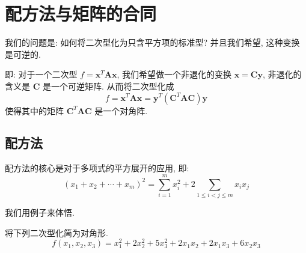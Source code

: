 \documentclass[UTF8]{book}
\begin{document}
\section{配方法与矩阵的合同}

我们的问题是: 
如何将二次型化为只含平方项的标准型? 
并且我们希望, 这种变换是可逆的. 

即: 对于一个二次型 $f = \boldsymbol{x}^T \boldsymbol{A} \boldsymbol{x}$, 
我们希望做一个非退化的变换 
$ \boldsymbol{x} = \boldsymbol{C}\boldsymbol{y} $, 
非退化的含义是 $ \boldsymbol{C} $ 是一个可逆矩阵. 
从而将二次型化成 
$$ f =\boldsymbol{x}^T \boldsymbol{A} \boldsymbol{x} =
\boldsymbol{y}^T (\boldsymbol{C}^T\boldsymbol{A} \boldsymbol{C})
\boldsymbol{y}  $$
使得其中的矩阵 $ \boldsymbol{C}^T\boldsymbol{A} \boldsymbol{C} $ 
是一个对角阵. 

\subsection{配方法}
配方法的核心是对于多项式的平方展开的应用, 即: 
\begin{equation*}
    (x_1+x_2+\cdots+x_m)^2  = \sum_{i=1}^{m} x_i^2 + 
    2 \sum_{1\leq i<j\leq m} x_ix_j
\end{equation*}

我们用例子来体悟. 


\begin{example}
    将下列二次型化简为对角形.
    $$f(x_1,x_2,x_3)=x_1^2 + 2x_2^2 + 5x_3^2 + 2x_1x_2 + 
    2x_1x_3 + 6x_2x_3$$   
\end{example}
\end{document}
